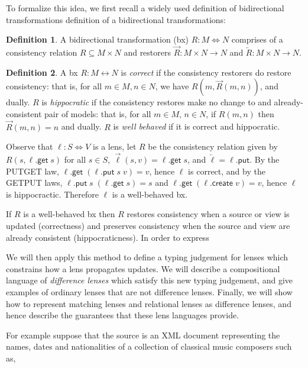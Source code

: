 \documentclass[acmsmall,review,anonymous]{acmart}\settopmatter{printfolios=true,printccs=false,printacmref=false}
\theoremstyle{definition}
\newtheorem{definition}{Definition}
\newcommand{\kw}[1]{\ensuremath{\mathsf{#1}}\xspace}
\newcommand{\get}{\ensuremath{\kw{get}}\xspace}
\newcommand{\pput}{\ensuremath{\kw{put}}\xspace}
\newcommand{\create}{\ensuremath{\kw{create}}\xspace}
\begin{document}
To formalize this idea, we first recall a widely used definition of
bidirectional transformations
\cite{meertens1998designing,stevens2010bidirectional} definition of a
bidirectional transformations:
\begin{definition}
A bidirectional transformation (bx) $R: M \Leftrightarrow N$ comprises of a
consistency relation $R \subseteq M \times N$ and restorers $\overrightarrow{R}
: M \times N \rightarrow N$ and $\overleftarrow{R} : M \times N \longrightarrow
N$.
\end{definition}
\begin{definition}
A bx $R : M \leftrightarrow N$ is {\em correct} if the consistency restorers do
restore consistency: that is, for all $m \in M, n \in N$, we have $R(m,
\overrightarrow{R}(m, n))$, and dually. $R$ is {\em hippocratic} if the
consistency restores make no change to and already-consistent pair of models:
that is, for all $m \in M$, $n \in N$, if $R(m, n)$ then $\overrightarrow{R}(m,
n) = n$ and dually. $R$ is {\em well behaved} if it is correct and hippocratic.
\end{definition}

Observe that $\ell : S \Leftrightarrow V$ is a lens, let $R$ be the
consistency relation given by $R(s, \ell.\get \; s)$ for all $s \in
S$, $\overrightarrow{\ell}(s, v) = \ell.\get \; s$, and $\overleftarrow{\ell} =
\ell.\pput$. By the PUTGET law, $\ell.\get \; (\ell.\pput \; s \; v) = v$,
hence $\ell$ is correct, and by the GETPUT laws, $\ell.\pput \; s \; (\ell.\get
\; s) = s$ and $\ell.\get \; (\ell.\create \; v) = v$, hence $\ell$ is
hippocractic. Therefore $\ell$ is a well-behaved bx.

If $R$ is a well-behaved bx then $R$ restores consistency when a source or view
is updated (correctness) and preserves consistency when the source and view are
already consistent (hippocraticness). In order to express

We will then apply this method to define a typing judgement for lenses which
constrains how a lens propagates updates. We will describe a compositional
language of {\em difference lenses} which satisfy this new typing judgement,
and give examples of ordinary lenses that are not difference lenses. Finally,
we will show how to represent matching lenses and relational lenses
\cite{bohannon2006relational} as difference lenses, and hence describe the
guarantees that these lens languages provide.


For example suppose that the source is an XML document representing the
names, dates and nationalities of a collection of classical music
composers such as,
\end{document}
